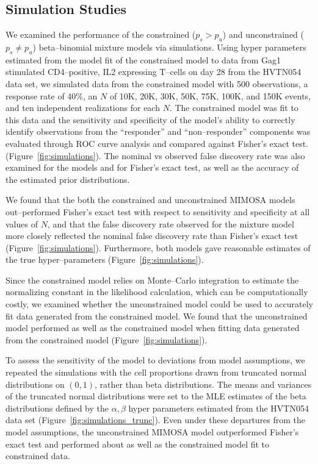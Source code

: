 \documentclass[11pt]{article}
\begin{document}
\subsection{Simulation Studies}
We examined the performance of the constrained ($p_s>p_u$) and unconstrained ($p_s \ne p_u$) beta--binomial mixture models via simulations. Using hyper parameters estimated from the model fit of the constrained model to data from Gag1 stimulated CD4--positive, IL2 expressing T--cells on day 28 from the HVTN054 data set, we simulated data from the constrained model with 500 observations, a response rate of 40\%, an $N$ of 10K, 20K, 30K, 50K, 75K, 100K, and 150K events, and ten independent realizations for each $N$. The constrained model was fit to this data and the sensitivity and specificity of the model's ability to correctly identify observations from the ``responder'' and ``non--responder'' components was evaluated through ROC curve analysis and compared against Fisher's exact test. (Figure~\ref{fig:simulations}). The nominal vs observed false discovery rate was also examined for the models and for Fisher's exact test, as well as the accuracy of the estimated prior distributions. 

We found that the both the constrained and unconstrained MIMOSA models out--performed Fisher's exact test with respect to sensitivity and specificity at all values of $N$, and that the false discovery rate observed for the mixture model more closely reflected the nominal false discovery rate than Fisher's exact test (Figure~\ref{fig:simulations}). Furthermore, both models gave reasonable estimates of the true hyper--parameters (Figure~\ref{fig:simulations}).

Since the constrained model relies on Monte--Carlo integration to estimate the normalizing constant in the likelihood calculation, which can be computationally costly,  we examined whether the unconstrained model could be used to accurately fit data generated from the constrained model. We found that the unconstrained model performed as well as the constrained model when fitting data generated from the constrained model (Figure~\ref{fig:simulations}).

To assess the sensitivity of the model to deviations from model assumptions, we repeated the simulations with the cell proportions drawn from  truncated normal distributions on $(0,1)$, rather than beta distributions. The means and variances of the truncated normal distributions were set to the MLE estimates of the beta distributions defined by the $\alpha,\beta$ hyper parameters estimated from the HVTN054 data set (Figure~\ref{fig:simulations_trunc}). Even under these departures from the model assumptions, the unconstrained MIMOSA model outperformed Fisher's exact test and performed about as well as the constrained model fit to constrained data.
\end{document}
